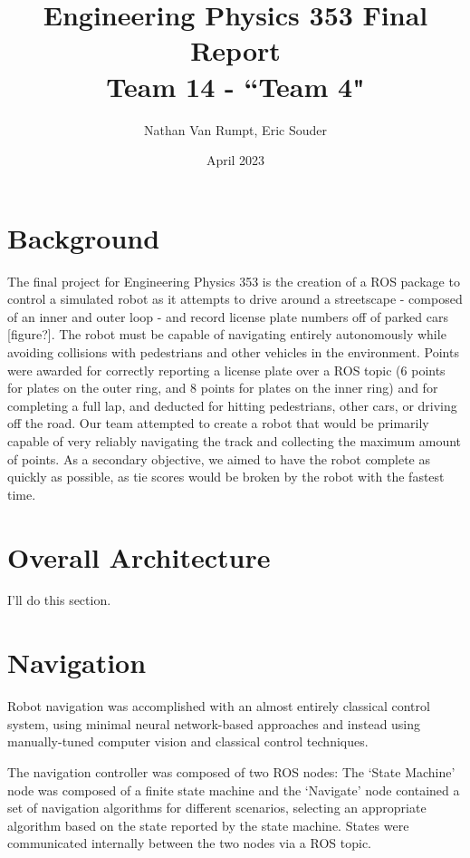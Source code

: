 \documentclass[titlepage, twocolumn]{article}
\title{%
    Engineering Physics 353 Final Report \\
    \large Team 14 - ``Team 4"}
\author{Nathan Van Rumpt, Eric Souder}
\date{April 2023}
\begin{document}
\maketitle

\section{Background}

    The final project for Engineering Physics 353 is the creation of a ROS package to control a simulated robot as it attempts to drive around a streetscape - composed of an inner and outer loop - and record license plate numbers off of parked cars [figure?]. The robot must be capable of navigating entirely autonomously while avoiding collisions with pedestrians and other vehicles in the environment. Points were awarded for correctly reporting a license plate over a ROS topic (6 points for plates on the outer ring, and 8 points for plates on the inner ring) and for completing a full lap, and deducted for hitting pedestrians, other cars, or driving off the road. Our team attempted to create a robot that would be primarily capable of very reliably navigating the track and collecting the maximum amount of points. As a secondary objective, we aimed to have the robot complete as quickly as possible, as tie scores would be broken by the robot with the fastest time.

\section{Overall Architecture}

    I'll do this section. 

\section{Navigation}
    Robot navigation was accomplished with an almost entirely classical control system, using minimal neural network-based approaches and instead using manually-tuned computer vision and classical control techniques. 

    The navigation controller was composed of two ROS nodes: The `State Machine' node was composed of a finite state machine and the `Navigate' node contained a set of navigation algorithms for different scenarios, selecting an appropriate algorithm based on the state reported by the state machine. States were communicated internally between the two nodes via a ROS topic.
    
\end{document}
